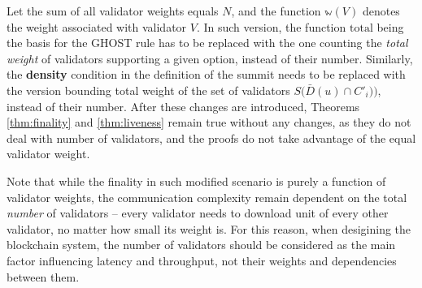 \documentclass[12pt, fleqn]{article}
\newcommand{\ww}{\mathbb{w}}
\begin{document}
Let the sum of all validator weights equals $N$, and the function $\ww(V)$ denotes the weight associated with validator $V$.
In such version, the function $\mathrm{total}$ being the basis for the GHOST rule has to be replaced with the one counting the \emph{total weight} of validators supporting a given option, instead of their number. 
Similarly, the \textbf{density} condition in the definition of the summit needs to be replaced with the version bounding total weight of the set of validators  $S\big(\bar{D}(u) \cap C'_i)\big)$, instead of their number. 
After these changes are introduced, Theorems \ref{thm:finality} and \ref{thm:liveness} remain true without any changes, as they do not deal with number of validators, and the proofs do not take advantage of the equal validator weight. 

Note that while the finality in such modified scenario is purely a function of validator weights, the communication complexity remain dependent on the total \emph{number} of validators -- every validator needs to download unit of every other validator, no matter how small its weight is.
For this reason, when desigining the blockchain system, the number of validators should be considered as the main factor influencing latency and throughput, not their weights and dependencies between them. 






\appendix
\end{document}

